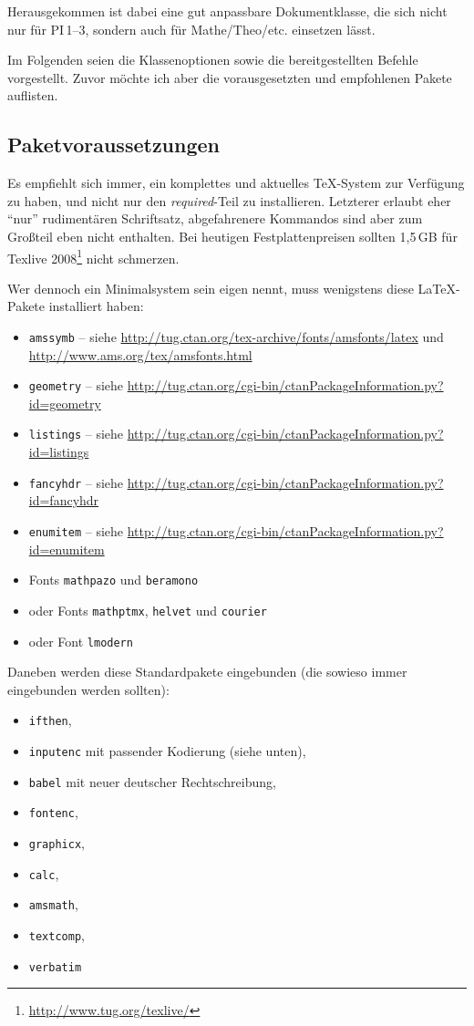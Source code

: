 \documentclass[nicefonts,nogruppe,nosemester,noveranstaltung,notutor,noabgabe,utf]{uhb-inf}
\begin{document}
Herausgekommen ist dabei eine gut anpassbare Dokumentklasse, die sich nicht nur für PI\,1--3, sondern auch für Mathe/Theo/etc. einsetzen lässt.

Im Folgenden seien die Klassenoptionen sowie die bereitgestellten Befehle vorgestellt. Zuvor möchte ich aber die vorausgesetzten und empfohlenen Pakete auflisten.

\subsection{Paketvoraussetzungen}

Es empfiehlt sich immer, ein komplettes und aktuelles \TeX-System zur Verfügung zu haben, und nicht nur den \textit{required}-Teil zu installieren. Letzterer erlaubt eher "`nur"' rudimentären Schriftsatz, abgefahrenere Kommandos sind aber zum Großteil eben nicht enthalten. Bei heutigen Festplattenpreisen sollten 1,5\,GB für Texlive 2008\footnote{\url{http://www.tug.org/texlive/}} nicht schmerzen.

Wer dennoch ein Minimalsystem sein eigen nennt, muss wenigstens diese \LaTeX-Pakete installiert haben:

\begin{itemize}
	\item \texttt{amssymb} -- siehe \url{http://tug.ctan.org/tex-archive/fonts/amsfonts/latex} und \url{http://www.ams.org/tex/amsfonts.html}
	\item \texttt{geometry} -- siehe \url{http://tug.ctan.org/cgi-bin/ctanPackageInformation.py?id=geometry}
	\item \texttt{listings} -- siehe \url{http://tug.ctan.org/cgi-bin/ctanPackageInformation.py?id=listings}
	\item \texttt{fancyhdr} -- siehe \url{http://tug.ctan.org/cgi-bin/ctanPackageInformation.py?id=fancyhdr}
	\item \texttt{enumitem} -- siehe \url{http://tug.ctan.org/cgi-bin/ctanPackageInformation.py?id=enumitem}
	\item Fonts \texttt{mathpazo} und \texttt{beramono}
	\item oder Fonts \texttt{mathptmx}, \texttt{helvet} und \texttt{courier}
	\item oder Font \texttt{lmodern}
\end{itemize}

Daneben werden diese Standardpakete eingebunden (die sowieso immer eingebunden werden sollten):

\begin{itemize}
	\item \texttt{ifthen},
	\item \texttt{inputenc} mit passender Kodierung (siehe unten),
	\item \texttt{babel} mit neuer deutscher Rechtschreibung,
	\item \texttt{fontenc},
	\item \texttt{graphicx},
	\item \texttt{calc},
	\item \texttt{amsmath},
	\item \texttt{textcomp},
	\item \texttt{verbatim}
\end{itemize}
\end{document}
